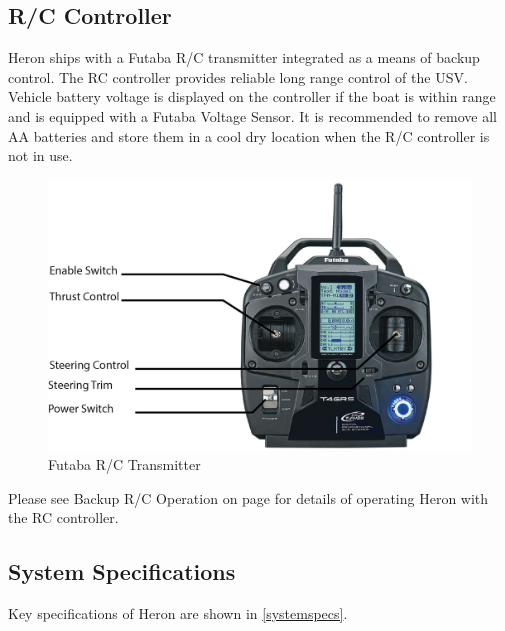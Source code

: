 \documentclass[]{clearpath-latex/clearpath-manual}
\begin{document}
\subsection{R/C Controller}
Heron ships with a Futaba R/C transmitter integrated as a means of backup control. The RC controller provides reliable long range control of the USV. Vehicle battery voltage is displayed on the controller if the boat is within range and is equipped with a Futaba Voltage Sensor.  It is recommended to remove all AA batteries and store them in a cool dry location when the R/C controller is not in use.

\begin{figure}[htb!]
  \centering
  \includegraphics[width=0.85\linewidth]{h-futaba.PNG}
  \caption{Futaba R/C Transmitter}
  \label{h_futaba}
\end{figure}

Please see Backup R/C Operation on page \pageref{backupoperation} for details of operating Heron with the RC controller.

\newpage

\subsection{System Specifications}
Key specifications of Heron are shown in \autoref{systemspecs}.
\end{document}
